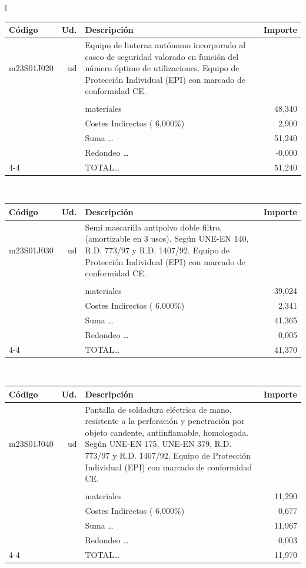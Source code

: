 \documentclass{book}%
\begin{document}
\begin{longtable}{l}
\begin{tabular}{l r p{60mm} r}
Código&Ud.&Descripción&Importe\\%
\hline%
m23S01J020&ud&Equipo de linterna autónomo incorporado al casco de seguridad valorado en función del número óptimo de utilizaciones. Equipo de Protección Individual (EPI) con marcado de conformidad CE.&\\%
&&&\\%
&&materiales&    48,340\\%
&&Costes Indirectos (     6,000\%)&     2,900\\%
&&Suma \ldots&    51,240\\%
&&Redondeo \ldots&    {-}0,000\\%
\cline{4-4}%
&&TOTAL\ldots&    51,240\\%
\end{tabular}\\%
\begin{tabular}{l r p{60mm} r}%
Código&Ud.&Descripción&Importe\\%
\hline%
m23S01J030&ud&Semi mascarilla antipolvo doble filtro, (amortizable en 3 usos). Según UNE{-}EN 140, R.D. 773/97 y R.D. 1407/92. Equipo de Protección Individual (EPI) con marcado de conformidad CE.&\\%
&&&\\%
&&materiales&    39,024\\%
&&Costes Indirectos (     6,000\%)&     2,341\\%
&&Suma \ldots&    41,365\\%
&&Redondeo \ldots&     0,005\\%
\cline{4-4}%
&&TOTAL\ldots&    41,370\\%
\end{tabular}\\%
\begin{tabular}{l r p{60mm} r}%
Código&Ud.&Descripción&Importe\\%
\hline%
m23S01J040&ud&Pantalla de soldadura eléctrica de mano, resistente a la perforación y penetración por objeto candente, antiinflamable, homologada. Según UNE{-}EN 175, UNE{-}EN 379, R.D. 773/97 y R.D. 1407/92. Equipo de Protección Individual (EPI) con marcado de conformidad CE.&\\%
&&&\\%
&&materiales&    11,290\\%
&&Costes Indirectos (     6,000\%)&     0,677\\%
&&Suma \ldots&    11,967\\%
&&Redondeo \ldots&     0,003\\%
\cline{4-4}%
&&TOTAL\ldots&    11,970\\%

\end{tabular}
\end{longtable}
\end{document}
